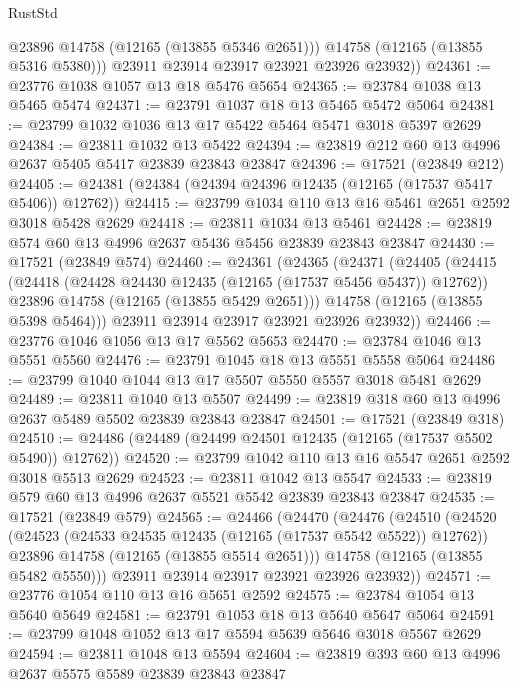 \begin{lexlean}{RustStd}
\begin{coremodule}
            @23896
            @14758
            (@12165 (@13855 @5346 @2651)))
          @14758
          (@12165 (@13855 @5316 @5380)))
        @23911
        @23914
        @23917
        @23921
        @23926
        @23932))
@24361 := @23776 @1038 @1057 @13 @18 @5476 @5654
@24365 := @23784 @1038 @13 @5465 @5474
@24371 := @23791 @1037 @18 @13 @5465 @5472 @5064
@24381 := @23799 @1032 @1036 @13 @17 @5422 @5464 @5471 @3018 @5397 @2629
@24384 := @23811 @1032 @13 @5422
@24394 := @23819 @212 @60 @13 @4996 @2637 @5405 @5417 @23839 @23843 @23847
@24396 := @17521 (@23849 @212)
@24405 := @24381 (@24384 (@24394 @24396 @12435 (@12165 (@17537 @5417 @5406)) @12762))
@24415 := @23799 @1034 @110 @13 @16 @5461 @2651 @2592 @3018 @5428 @2629
@24418 := @23811 @1034 @13 @5461
@24428 := @23819 @574 @60 @13 @4996 @2637 @5436 @5456 @23839 @23843 @23847
@24430 := @17521 (@23849 @574)
@24460 := @24361
    (@24365
      (@24371
        (@24405
          (@24415
            (@24418 (@24428 @24430 @12435 (@12165 (@17537 @5456 @5437)) @12762))
            @23896
            @14758
            (@12165 (@13855 @5429 @2651)))
          @14758
          (@12165 (@13855 @5398 @5464)))
        @23911
        @23914
        @23917
        @23921
        @23926
        @23932))
@24466 := @23776 @1046 @1056 @13 @17 @5562 @5653
@24470 := @23784 @1046 @13 @5551 @5560
@24476 := @23791 @1045 @18 @13 @5551 @5558 @5064
@24486 := @23799 @1040 @1044 @13 @17 @5507 @5550 @5557 @3018 @5481 @2629
@24489 := @23811 @1040 @13 @5507
@24499 := @23819 @318 @60 @13 @4996 @2637 @5489 @5502 @23839 @23843 @23847
@24501 := @17521 (@23849 @318)
@24510 := @24486 (@24489 (@24499 @24501 @12435 (@12165 (@17537 @5502 @5490)) @12762))
@24520 := @23799 @1042 @110 @13 @16 @5547 @2651 @2592 @3018 @5513 @2629
@24523 := @23811 @1042 @13 @5547
@24533 := @23819 @579 @60 @13 @4996 @2637 @5521 @5542 @23839 @23843 @23847
@24535 := @17521 (@23849 @579)
@24565 := @24466
    (@24470
      (@24476
        (@24510
          (@24520
            (@24523 (@24533 @24535 @12435 (@12165 (@17537 @5542 @5522)) @12762))
            @23896
            @14758
            (@12165 (@13855 @5514 @2651)))
          @14758
          (@12165 (@13855 @5482 @5550)))
        @23911
        @23914
        @23917
        @23921
        @23926
        @23932))
@24571 := @23776 @1054 @110 @13 @16 @5651 @2592
@24575 := @23784 @1054 @13 @5640 @5649
@24581 := @23791 @1053 @18 @13 @5640 @5647 @5064
@24591 := @23799 @1048 @1052 @13 @17 @5594 @5639 @5646 @3018 @5567 @2629
@24594 := @23811 @1048 @13 @5594
@24604 := @23819 @393 @60 @13 @4996 @2637 @5575 @5589 @23839 @23843 @23847

\end{coremodule}
\end{lexlean}
